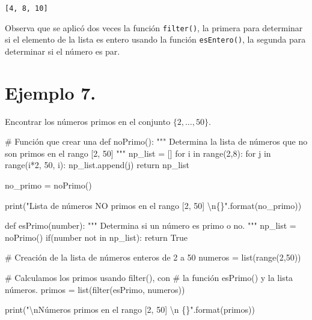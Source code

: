 \documentclass[
  letterpaper,
  DIV=11,
  numbers=noendperiod]{scrreprt}
\newenvironment{Shaded}{\begin{snugshade}}{\end{snugshade}}
\newcommand{\BuiltInTok}[1]{\textcolor[rgb]{0.00,0.23,0.31}{#1}}
\newcommand{\CharTok}[1]{\textcolor[rgb]{0.13,0.47,0.30}{#1}}
\newcommand{\CommentTok}[1]{\textcolor[rgb]{0.37,0.37,0.37}{#1}}
\newcommand{\ControlFlowTok}[1]{\textcolor[rgb]{0.00,0.23,0.31}{#1}}
\newcommand{\DecValTok}[1]{\textcolor[rgb]{0.68,0.00,0.00}{#1}}
\newcommand{\KeywordTok}[1]{\textcolor[rgb]{0.00,0.23,0.31}{#1}}
\newcommand{\NormalTok}[1]{\textcolor[rgb]{0.00,0.23,0.31}{#1}}
\newcommand{\OperatorTok}[1]{\textcolor[rgb]{0.37,0.37,0.37}{#1}}
\newcommand{\SpecialCharTok}[1]{\textcolor[rgb]{0.37,0.37,0.37}{#1}}
\newcommand{\StringTok}[1]{\textcolor[rgb]{0.13,0.47,0.30}{#1}}
\newcommand{\VariableTok}[1]{\textcolor[rgb]{0.07,0.07,0.07}{#1}}
\begin{document}
\begin{verbatim}
[4, 8, 10]
\end{verbatim}

Observa que se aplicó dos veces la función \texttt{filter()}, la primera
para determinar si el elemento de la lista es entero usando la función
\texttt{esEntero()}, la segunda para determinar si el número es par.

\section{\texorpdfstring{\textbf{Ejemplo
7.}}{Ejemplo 7.}}\label{ejemplo-7.-1}

Encontrar los números primos en el conjunto \(\{2, \dots, 50\}\).

\begin{Shaded}
\begin{Highlighting}[]
\CommentTok{\# Función que crear una }
\KeywordTok{def}\NormalTok{ noPrimo():}
    \CommentTok{"""}
\CommentTok{    Determina la lista de números que no son primos en el }
\CommentTok{    rango [2, 50]}
\CommentTok{    """}
\NormalTok{    np\_list }\OperatorTok{=}\NormalTok{ []}
    \ControlFlowTok{for}\NormalTok{ i }\KeywordTok{in} \BuiltInTok{range}\NormalTok{(}\DecValTok{2}\NormalTok{,}\DecValTok{8}\NormalTok{):}
        \ControlFlowTok{for}\NormalTok{ j }\KeywordTok{in} \BuiltInTok{range}\NormalTok{(i}\OperatorTok{*}\DecValTok{2}\NormalTok{, }\DecValTok{50}\NormalTok{, i):}
\NormalTok{            np\_list.append(j)}
    \ControlFlowTok{return}\NormalTok{ np\_list}

\NormalTok{no\_primo }\OperatorTok{=}\NormalTok{ noPrimo()}

\BuiltInTok{print}\NormalTok{(}\StringTok{"Lista de números NO primos en el rango [2, 50] }\CharTok{\textbackslash{}n}\SpecialCharTok{\{\}}\StringTok{"}\NormalTok{.}\BuiltInTok{format}\NormalTok{(no\_primo))}

\KeywordTok{def}\NormalTok{ esPrimo(number):}
    \CommentTok{"""}
\CommentTok{    Determina si un número es primo o no.}
\CommentTok{    """}
\NormalTok{    np\_list }\OperatorTok{=}\NormalTok{ noPrimo()}
    \ControlFlowTok{if}\NormalTok{(number }\KeywordTok{not} \KeywordTok{in}\NormalTok{ np\_list):}
        \ControlFlowTok{return} \VariableTok{True}

\CommentTok{\# Creación de la lista de números enteros de 2 a 50}
\NormalTok{numeros }\OperatorTok{=} \BuiltInTok{list}\NormalTok{(}\BuiltInTok{range}\NormalTok{(}\DecValTok{2}\NormalTok{,}\DecValTok{50}\NormalTok{))}

\CommentTok{\# Calculamos los primos usando filter(), con }
\CommentTok{\# la función esPrimo() y la lista números.}
\NormalTok{primos }\OperatorTok{=} \BuiltInTok{list}\NormalTok{(}\BuiltInTok{filter}\NormalTok{(esPrimo, numeros))}

\BuiltInTok{print}\NormalTok{(}\StringTok{"}\CharTok{\textbackslash{}n}\StringTok{Números primos en el rango [2, 50] }\CharTok{\textbackslash{}n}\StringTok{ }\SpecialCharTok{\{\}}\StringTok{"}\NormalTok{.}\BuiltInTok{format}\NormalTok{(primos))}
\end{Highlighting}
\end{Shaded}
\end{document}
